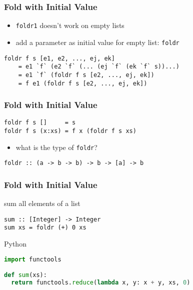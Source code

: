 \documentclass[dvipsnames]{beamer}
\theoremstyle{plain}
\begin{document}
\begin{frame}[fragile]
  \frametitle{Fold with Initial Value}

  \begin{itemize}
    \item \lstinline{foldr1} doesn't work on empty lists
    \item add a parameter as initial value for empty list:
      \lstinline{foldr}
  \end{itemize}

  \begin{block}{}
    \begin{lstlisting}
foldr f s [e1, e2, ..., ej, ek]
    = e1 `f` (e2 `f` (... (ej `f` (ek `f` s))...)
    = e1 `f` (foldr f s [e2, ..., ej, ek])
    = f e1 (foldr f s [e2, ..., ej, ek])
    \end{lstlisting}
  \end{block}
\end{frame}

\begin{frame}[fragile]
  \frametitle{Fold with Initial Value}

  \begin{exampleblock}{}
    \begin{lstlisting}
foldr f s []     = s
foldr f s (x:xs) = f x (foldr f s xs)
    \end{lstlisting}

    \pause
    \begin{itemize}
      \item what is the type of \lstinline{foldr}?
    \end{itemize}

    \begin{lstlisting}
foldr :: (a -> b -> b) -> b -> [a] -> b
    \end{lstlisting}
  \end{exampleblock}
\end{frame}

\begin{frame}[fragile]
  \frametitle{Fold with Initial Value}

  \begin{exampleblock}{sum all elements of a list}
    \begin{lstlisting}
sum :: [Integer] -> Integer
sum xs = foldr (+) 0 xs
    \end{lstlisting}
  \end{exampleblock}

  \bigskip
  \begin{exampleblock}{Python}
    \begin{lstlisting}[language=python]
import functools

def sum(xs):
  return functools.reduce(lambda x, y: x + y, xs, 0)
    \end{lstlisting}
  \end{exampleblock}
\end{frame}
\end{document}
